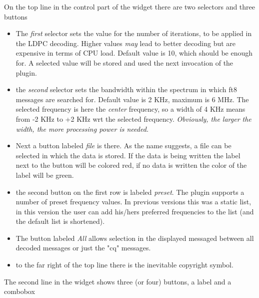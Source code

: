 \documentclass[11pt]{article}
\begin{document}
On the top  line in the control part of the widget there are
two selectors and three buttons
\begin{itemize}
\item
The {\em first} selector sets the value for the number of iterations,
to be applied in the LDPC decoding. Higher values
{\em may} lead to better decoding but are expensive in terms of CPU load.
Default value is 10, which should be enough for.
A selected value will be stored and used the
next invocation of the plugin.
\item
 the {\em second} selector sets the bandwidth within the spectrum
in which ft8 messages are searched for.
Default value is 2 KHz, maximum is 6 MHz.
The selected frequency is here the {\em center} frequency, so a
width of 4 KHz means from -2 KHz to +2 KHz wrt the selected frequency.
{\em Obviously, the larger the width, the more processing power is needed.}
\item
Next a button labeled {\em file} is there. As the name suggests, a file can
be selected in which the data is stored. If the data is being written the
label next to the button will be colored red, if no data is written the color
of the label will be green.
\item the second button on the first row is labeled {\em preset}. The plugin 
supports a number of preset frequency values. In previous versions this was a
static list, in this version the user can add his/hers preferred frequencies
to the list (and the default list is shortened).
\item The button labeled {\em All} allows selection in the displayed messaged
between all decoded messages or just the "cq" messages.
\item to the far right of the top line there is the inevitable copyright symbol.
\end{itemize}
The second line in the widget shows three (or four) buttons, a label
and a combobox
\end{document}

